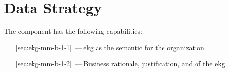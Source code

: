 \chapter{Data Strategy}\label{ch:ekg-mm-b-1}\label{ch:ekg-mm-data-strategy} %

The  component has the following capabilities:

\begin{itemize}[leftmargin=.5in]
    \item [\ref{sec:ekg-mm-b-1-1}] \,---\,\gls{ekg} as the semantic  for the organization
    \item [\ref{sec:ekg-mm-b-1-2}] \,---\,Business rationale, justification, and  of the \gls{ekg}
\end{itemize}


